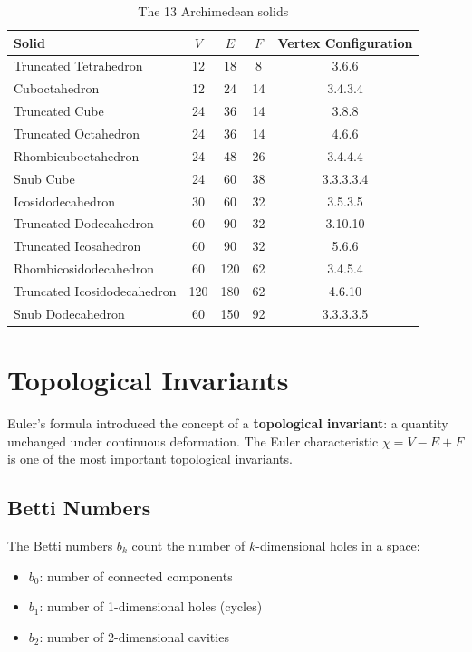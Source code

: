 \begin{table}[H]
\centering
\small
\begin{tabular}{l|c|c|c|c}
Solid & $V$ & $E$ & $F$ & Vertex Configuration \\
\hline
Truncated Tetrahedron & 12 & 18 & 8 & 3.6.6 \\
Cuboctahedron & 12 & 24 & 14 & 3.4.3.4 \\
Truncated Cube & 24 & 36 & 14 & 3.8.8 \\
Truncated Octahedron & 24 & 36 & 14 & 4.6.6 \\
Rhombicuboctahedron & 24 & 48 & 26 & 3.4.4.4 \\
Snub Cube & 24 & 60 & 38 & 3.3.3.3.4 \\
Icosidodecahedron & 30 & 60 & 32 & 3.5.3.5 \\
Truncated Dodecahedron & 60 & 90 & 32 & 3.10.10 \\
Truncated Icosahedron & 60 & 90 & 32 & 5.6.6 \\
Rhombicosidodecahedron & 60 & 120 & 62 & 3.4.5.4 \\
Truncated Icosidodecahedron & 120 & 180 & 62 & 4.6.10 \\
Snub Dodecahedron & 60 & 150 & 92 & 3.3.3.3.5 \\
\end{tabular}
\caption{The 13 Archimedean solids}
\label{tab:archimedean}
\end{table}

\section{Topological Invariants}

Euler's formula introduced the concept of a \textbf{topological invariant}: a quantity
unchanged under continuous deformation. The Euler characteristic $\chi = V - E + F$ is
one of the most important topological invariants.

\subsection{Betti Numbers}

The Betti numbers $b_k$ count the number of $k$-dimensional holes in a space:
\begin{itemize}
\item $b_0$: number of connected components
\item $b_1$: number of 1-dimensional holes (cycles)
\item $b_2$: number of 2-dimensional cavities
\end{itemize}

